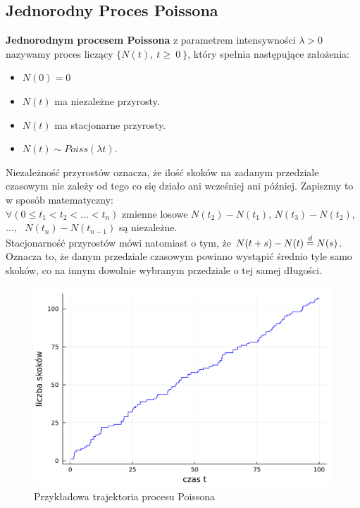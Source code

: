 \documentclass{article}
\theoremstyle{break}
\numberwithin{equation}{subsection}
\numberwithin{figure}{section}
\begin{document}
\subsection{Jednorodny Proces Poissona}

\textbf{Jednorodnym procesem Poissona} z parametrem intensywności $\lambda > 0$ nazywamy proces liczący $\{N(t),~t\ge~0~\}$, który spełnia następujące założenia:
\begin{itemize}
\item $N(0) = 0$
\item $N(t)$ ma niezależne przyrosty.
\item $N(t)$ ma stacjonarne przyrosty.
\item $N(t) \sim Poiss(\lambda t).$
\end{itemize}

Niezależność przyrostów oznacza, że ilość skoków na zadanym przedziale czasowym nie zależy od tego co się działo ani wcześniej ani później. Zapiszmy to w sposób matematyczny:\\
 $\forall{(0\le t_1<t_2<...<t_n)}$ zmienne losowe $N(t_2)- N(t_1)$, $N(t_3)-N(t_2)$, ...,~ $N(t_n)- N(t_{n-1})$ są niezależne.\\
Stacjonarność przyrostów mówi natomiast o tym, że $N(t+s)-N(t)\buildrel d \over = N(s)$. Oznacza to, że danym przedziale czasowym powinno wystąpić średnio tyle samo skoków, co na innym dowolnie wybranym przedziale o tej samej długości.

\begin{figure}[H]
	\center
	\includegraphics[scale=0.35]{trajektoria_poissona.pdf}
	\caption{Przykładowa trajektoria procesu Poissona}
	\label{fig: 1}
\end{figure}
\end{document}
